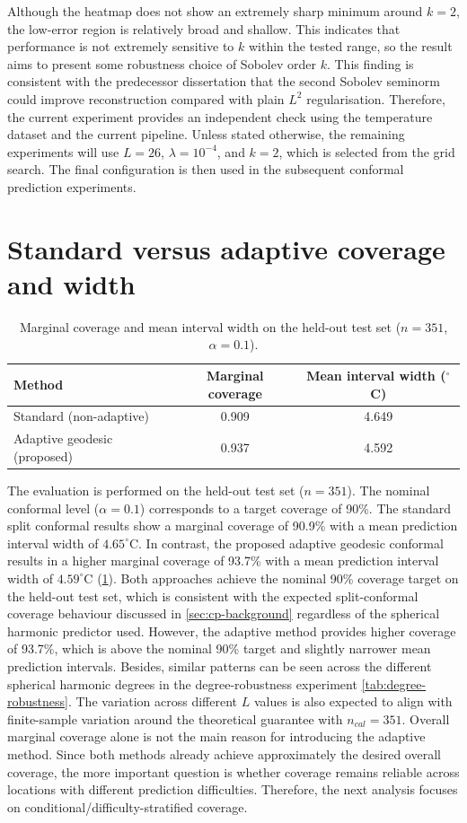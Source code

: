\documentclass[11pt,a4paper]{report}
\begin{document}
Although the heatmap does not show an extremely sharp minimum around $k=2$, the low-error region is relatively broad and shallow. This indicates that performance is not extremely sensitive to $k$ within the tested range, so the result aims to present some robustness choice of Sobolev order $k$. This finding is consistent with the predecessor dissertation that the second Sobolev seminorm could improve reconstruction compared with plain $L^2$ regularisation. Therefore, the current experiment provides an independent check using the temperature dataset and the current pipeline. Unless stated otherwise, the remaining experiments will use $L=26$, $\lambda=10^{-4}$, and $k=2$, which is selected from the grid search. The final configuration is then used in the subsequent conformal prediction experiments. 
 
\section{Standard versus adaptive coverage and width}
\label{sec:main-results}
\begin{table}[H]
\centering
\caption{Marginal coverage and mean interval width on the held-out test set ($n=351$, $\alpha=0.1$).}
\label{tab:main-coverage}
\begin{tabular}{lcc}
\toprule
Method & Marginal coverage & Mean interval width ($^\circ$C) \\
\midrule
Standard (non-adaptive) & 0.909 & 4.649 \\
Adaptive geodesic (proposed) & 0.937 & 4.592 \\
\bottomrule
\end{tabular}
\end{table}
The evaluation is performed on the held-out test set ($n=351$). The nominal conformal level ($\alpha=0.1$) corresponds to a target coverage of 90\%. The standard split conformal results show a marginal coverage of 90.9\% with a mean prediction interval width of $4.65^\circ\mathrm{C}$. In contrast, the proposed adaptive geodesic conformal results in a higher marginal coverage of 93.7\% with a mean prediction interval width of $4.59^\circ\mathrm{C}$ (\cref{tab:main-coverage}). Both approaches achieve the nominal 90\% coverage target on the held-out test set, which is consistent with the expected split-conformal coverage behaviour discussed in \cref{sec:cp-background} regardless of the spherical harmonic predictor used. However, the adaptive method provides higher coverage of 93.7\%, which is above the nominal 90\% target and slightly narrower mean prediction intervals. Besides, similar patterns can be seen across the different spherical harmonic degrees in the degree-robustness experiment \cref{tab:degree-robustness}. The variation across different $L$ values is also expected to align with finite-sample variation around the theoretical guarantee with $n_{cal}=351$. Overall marginal coverage alone is not the main reason for introducing the adaptive method. Since both methods already achieve approximately the desired overall coverage, the more important question is whether coverage remains reliable across locations with different prediction difficulties. Therefore, the next analysis focuses on conditional/difficulty-stratified coverage.
\end{document}
